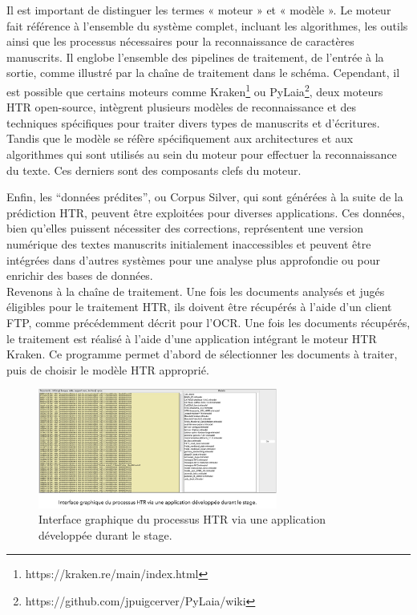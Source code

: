 \documentclass[a4paper,12pt,twoside]{book}
\begin{document}
	Il est important de distinguer les termes « moteur » et « modèle ». Le moteur fait référence à l’ensemble du système complet, incluant les algorithmes, les outils ainsi que les processus nécessaires pour la reconnaissance de caractères manuscrits. Il englobe l’ensemble des pipelines de traitement, de l’entrée à la sortie, comme illustré par la chaîne de traitement dans le schéma. Cependant, il est possible que certains moteurs comme Kraken\footnote{ https://kraken.re/main/index.html} ou PyLaia\footnote{https://github.com/jpuigcerver/PyLaia/wiki}, deux moteurs HTR open-source, intègrent plusieurs modèles de reconnaissance et des techniques spécifiques pour traiter divers types de manuscrits et d’écritures. Tandis que le modèle se réfère spécifiquement aux architectures et aux algorithmes qui sont utilisés au sein du moteur pour effectuer la reconnaissance du texte. Ces derniers sont des composants clefs du moteur.

	Enfin, les “données prédites”, ou Corpus Silver, qui sont générées à la suite de la prédiction HTR, peuvent être exploitées pour diverses applications. Ces données, bien qu’elles puissent nécessiter des corrections, représentent une version numérique des textes manuscrits initialement inaccessibles et peuvent être intégrées dans d’autres systèmes pour une analyse plus approfondie ou pour enrichir des bases de données.
	\\
	
	Revenons à la chaîne de traitement. Une fois les documents analysés et jugés éligibles pour le traitement HTR, ils doivent être récupérés à l'aide d'un client FTP, comme précédemment décrit pour l'OCR. Une fois les documents récupérés, le traitement est réalisé à l'aide d'une application intégrant le moteur HTR Kraken. Ce programme permet d'abord de sélectionner les documents à traiter, puis de choisir le modèle HTR approprié. 
	\\
	
	\begin{figure}[H]
		\centering
		\includegraphics[width=0.7\textwidth]{images/app_htr_proc.png}
		\caption{Interface graphique du processus HTR via une application développée durant le stage.}
		\label{fig:monimage}
	\end{figure}
	
\end{document}
